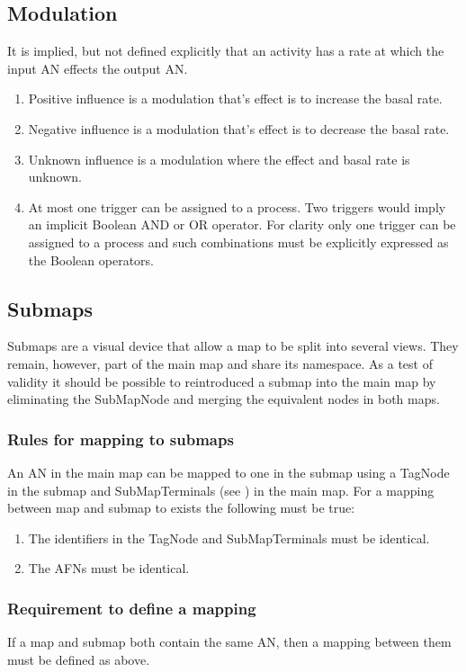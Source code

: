\subsection{Modulation}

It is implied, but not defined explicitly that an activity has a rate at which the input AN effects the output AN. 

\begin{enumerate}
\item Positive influence is a modulation that's effect is to increase the basal rate.
\item Negative influence is a modulation that's effect is to decrease the basal rate.
\item Unknown influence is a modulation where the effect and basal rate is unknown.
\item At most one trigger can be assigned to a process. Two triggers
  would imply an implicit Boolean AND or OR operator. For clarity only
  one trigger can be assigned to a process and such combinations must be
  explicitly expressed as the Boolean operators.
\end{enumerate}

\subsection{Submaps}

Submaps are a visual device that allow a map to be split into several views. They remain, however, part of the main map and share its
namespace. As a test of validity it should be possible to reintroduced a submap into the main map by eliminating the SubMapNode and merging
the equivalent nodes in both maps.

\subsubsection{Rules for mapping to submaps}

An AN in the main map can be mapped to one in the submap using a TagNode in the submap and SubMapTerminals (see ) in the main map. For a
mapping between map and submap to exists the following must be true:

\begin{enumerate}
\item The identifiers in the TagNode and SubMapTerminals must be identical.
\item The AFNs must be identical.
\end{enumerate}

\subsubsection{Requirement to define a mapping}

If a map and submap both contain the same AN, then a mapping between them must be defined as above.